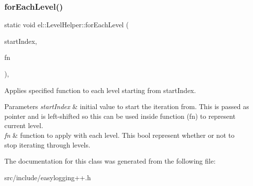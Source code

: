 \subsubsection{\texorpdfstring{for\+Each\+Level()}{forEachLevel()}}
{\footnotesize\ttfamily static void el\+::\+Level\+Helper\+::for\+Each\+Level (\begin{DoxyParamCaption}\item[{base\+::type\+::\+Enum\+Type $\ast$}]{start\+Index,  }\item[{const std\+::function$<$ bool(void)$>$ \&}]{fn }\end{DoxyParamCaption})\hspace{0.3cm}{\ttfamily [inline]}, {\ttfamily [static]}}



Applies specified function to each level starting from start\+Index. 


\begin{DoxyParams}{Parameters}
{\em start\+Index} & initial value to start the iteration from. This is passed as pointer and is left-\/shifted so this can be used inside function (fn) to represent current level. \\
\hline
{\em fn} & function to apply with each level. This bool represent whether or not to stop iterating through levels. \\
\hline
\end{DoxyParams}


The documentation for this class was generated from the following file\+:\begin{DoxyCompactItemize}
\item 
src/include/easylogging++.\+h\end{DoxyCompactItemize}
